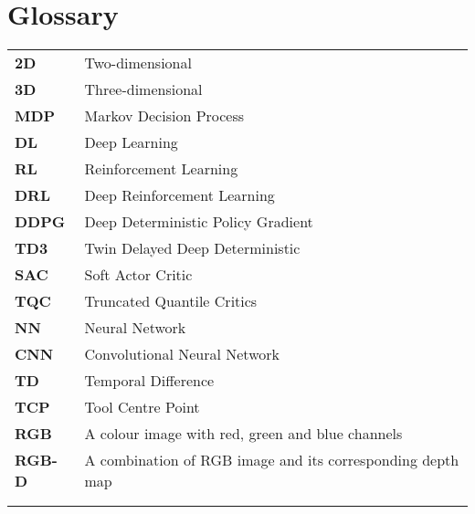 %
\chapter*{Glossary}

\capstartfalse
\begin{table}[!hb]
    \begin{tabular}{ll}
        \textbf{2D}    & Two-dimensional                                            \\
        \textbf{3D}    & Three-dimensional                                          \\
        \textbf{MDP}   & Markov Decision Process                                    \\
        \textbf{DL}    & Deep Learning                                              \\
        \textbf{RL}    & Reinforcement Learning                                     \\
        \textbf{DRL}   & Deep Reinforcement Learning                                \\
        \textbf{DDPG}  & Deep Deterministic Policy Gradient                         \\
        \textbf{TD3}   & Twin Delayed Deep Deterministic                            \\
        \textbf{SAC}   & Soft Actor Critic                                          \\
        \textbf{TQC}   & Truncated Quantile Critics                                 \\
        \textbf{NN}    & Neural Network                                             \\
        \textbf{CNN}   & Convolutional Neural Network                               \\
        \textbf{TD}    & Temporal Difference                                        \\
        \textbf{TCP}   & Tool Centre Point                                          \\
        \textbf{RGB}   & A colour image with red, green and blue channels           \\
        \textbf{RGB-D} & A combination of RGB image and its corresponding depth map \\
        \textbf{}      &                                                            \\
        \textbf{}      &                                                            \\

\end{tabular}
\end{table}
